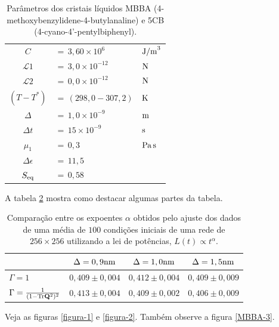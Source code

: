 \begin{table}[!htb]
\begin{minipage}[b]{0.49\linewidth}
\begin{center}
\begin{tabular}{c l l}
	$C$               & $= \, 3,60  \times 10^{6}$   & ${\rm J/m}^{3}$  \\
	$\mathcal{L}1$    & $= \, 3,0   \times 10^{-12}$ & ${\rm N}$        \\
	$\mathcal{L}2$    & $= \, 0,0   \times 10^{-12}$ & ${\rm N}$        \\
	$(T-T^{*})$       & $= \, (298,0- 307,2)$        & ${\rm K}$        \\
	$\Delta$          & $= \, 1,0   \times 10^{-9}$  & ${\rm m}$        \\
	$\Delta t$        & $= \, 15    \times 10^{-9}$  & ${\rm s}$        \\
	$\mu_1$           & $= \, 0,3 $                  & ${\rm Pa\, s}$   \\
	$\Delta \epsilon$ & $= \, 11,5$                  &                  \\
	$S_{\rm eq}$      & $= \, 0,58$                  &                  \\
	\hline
	    \end{tabular}
	  \end{center}
	\end{minipage}
	\caption{{\small Parâmetros dos cristais líquidos
MBBA (4-methoxybenzylidene-4-butylanaline) e 5CB
(4-cyano-4'-pentylbiphenyl).}}
	\label{tabela}
\end{table}

A tabela \ref{tabela1} mostra como destacar algumas partes da tabela.
\begin{table}[!htb]
  \begin{center}
    \begin{tabular}{ l | c | c | c }
& $\Delta =0,9 {\rm nm}$ & $\Delta =1,0 {\rm nm}$ & $\Delta =1,5 {\rm
nm}$ \\
		\hline
$\Gamma =1$ & $0,409\pm 0,004$ & \cellcolor[gray]{0.9} $0,412\pm 0,004$
& $0,409\pm 0,009$ \\
		\hline
$\Gamma =\frac{1}{(1-{\rm Tr}{\bf Q}^2)^2}$ & \cellcolor[gray]{0.9}
$0,413\pm 0,004$ & $0,409\pm 0,002$ & $0,406\pm 0,009$ \\
		\hline
    \end{tabular}
  \end{center}
\caption{Comparação entre os expoentes $\alpha$ obtidos pelo
ajuste dos dados de uma média de $100$ condições iniciais de uma rede
de $256 \times 256$ utilizando a lei de potências, $L(t) \varpropto
t^{\alpha}$.}
	\label{tabela1}
\end{table}

Veja as figuras \ref{figura-1} e \ref{figura-2}. Também observe a figura
\ref{MBBA-3}.

